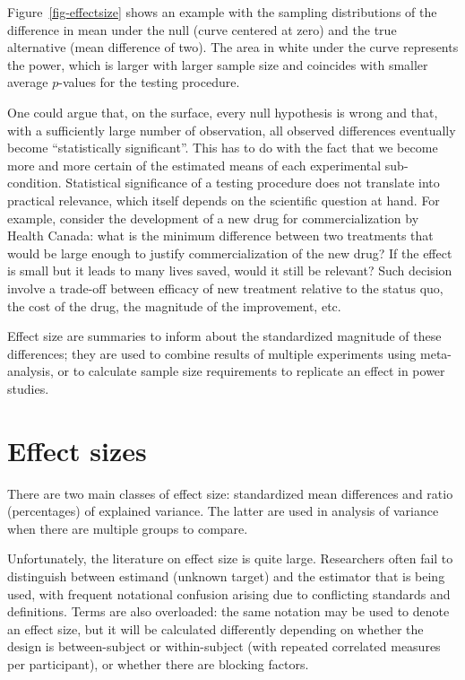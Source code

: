 \documentclass[
  11pt,
  letterpaper,
]{scrbook}
\theoremstyle{definition}
\theoremstyle{definition}
\theoremstyle{remark}
\begin{document}
Figure~\ref{fig-effectsize} shows an example with the sampling
distributions of the difference in mean under the null (curve centered
at zero) and the true alternative (mean difference of two). The area in
white under the curve represents the power, which is larger with larger
sample size and coincides with smaller average \(p\)-values for the
testing procedure.

One could argue that, on the surface, every null hypothesis is wrong and
that, with a sufficiently large number of observation, all observed
differences eventually become ``statistically significant''. This has to
do with the fact that we become more and more certain of the estimated
means of each experimental sub-condition. Statistical significance of a
testing procedure does not translate into practical relevance, which
itself depends on the scientific question at hand. For example, consider
the development of a new drug for commercialization by Health Canada:
what is the minimum difference between two treatments that would be
large enough to justify commercialization of the new drug? If the effect
is small but it leads to many lives saved, would it still be relevant?
Such decision involve a trade-off between efficacy of new treatment
relative to the status quo, the cost of the drug, the magnitude of the
improvement, etc.

Effect size are summaries to inform about the standardized magnitude of
these differences; they are used to combine results of multiple
experiments using meta-analysis, or to calculate sample size
requirements to replicate an effect in power studies.

\section{Effect sizes}\label{effect-sizes}

There are two main classes of effect size: standardized mean differences
and ratio (percentages) of explained variance. The latter are used in
analysis of variance when there are multiple groups to compare.

Unfortunately, the literature on effect size is quite large. Researchers
often fail to distinguish between estimand (unknown target) and the
estimator that is being used, with frequent notational confusion arising
due to conflicting standards and definitions. Terms are also overloaded:
the same notation may be used to denote an effect size, but it will be
calculated differently depending on whether the design is
between-subject or within-subject (with repeated correlated measures per
participant), or whether there are blocking factors.
\end{document}
